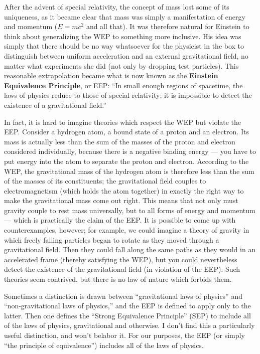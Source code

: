 After the advent of special relativity, the concept of mass lost
some of its uniqueness, as it became clear that mass was simply a
manifestation of energy and momentum ($E=mc^2$ and all that).  It
was therefore natural for Einstein to think about generalizing the
WEP to something more inclusive.  His idea was simply that there
should be no way whatsoever for the physicist in the box to distinguish
between uniform acceleration and an external gravitational field, no
matter what experiments she did (not only by dropping test particles).
This reasonable extrapolation became what is now known as the 
{\bf Einstein Equivalence Principle}, or EEP: ``In small enough
regions of spacetime, the laws of physics reduce to those of special
relativity; it is impossible to detect the existence of a gravitational
field.''

In fact, it is hard to imagine theories which respect the WEP but
violate the EEP.  Consider a hydrogen atom, a bound state of a proton
and an electron.  Its mass is actually less than the sum of the masses
of the proton and electron considered individually, because there is
a negative binding energy --- you have to put energy into the atom
to separate the proton and electron.  According to the WEP, the 
gravitational mass of the hydrogen atom is therefore less than the
sum of the masses of its constituents; the gravitational field couples
to electromagnetism (which holds the atom together) in exactly the
right way to make the gravitational mass come out right.  This means
that not only must gravity couple to rest mass universally, but to
all forms of energy and momentum --- which is practically the claim of 
the EEP.  It is possible to come up with counterexamples, however; for
example, we could imagine a theory of gravity in which freely falling 
particles began to rotate as they moved through a gravitational field.  
Then they could fall along the same paths as they would in an accelerated 
frame (thereby satisfying the WEP), but you could nevertheless detect the
existence of the gravitational field (in violation of the EEP).
Such theories seem contrived, but there is no law of nature which
forbids them.

Sometimes a distinction is drawn between ``gravitational laws of
physics'' and ``non-gravitational laws of physics,'' and the EEP
is defined to apply only to the latter.  Then one defines the
``Strong Equivalence Principle'' (SEP) to include all of the laws of
physics, gravitational and otherwise.  I don't find this a particularly
useful distinction, and won't belabor it.  For our purposes, the
EEP (or simply ``the principle of equivalence'') includes all of the
laws of physics.


